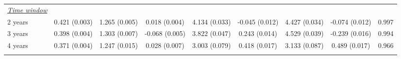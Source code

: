 \begin{tabular}{@{\extracolsep{5pt}} l cccccccc}
\underline{{\it Time window}} &   &   &   &   &   &   &   &  \\ 
2 years & 0.421 (0.003) & 1.265 (0.005) & 0.018 (0.004) & 4.134 (0.033) & -0.045 (0.012) & 4.427 (0.034) & -0.074 (0.012) & 0.997 \\ 
3 years & 0.398 (0.004) & 1.303 (0.007) & -0.068 (0.005) & 3.822 (0.047) & 0.243 (0.014) & 4.529 (0.039) & -0.239 (0.016) & 0.994 \\ 
4 years & 0.371 (0.004) & 1.247 (0.015) & 0.028 (0.007) & 3.003 (0.079) & 0.418 (0.017) & 3.133 (0.087) & 0.489 (0.017) & 0.966 \\ 
\hline \\[-1.8ex] 
\end{tabular} 
